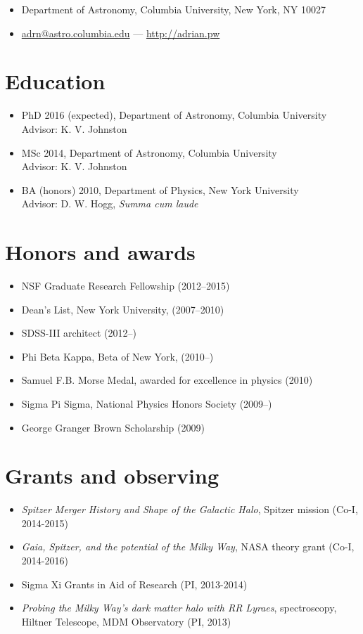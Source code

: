 \documentclass[12pt,letterpaper]{article}
\begin{document}
\thispagestyle{empty}\sloppy\sloppypar

{\huge \name}

\begin{itemize}
  \item Department of Astronomy, Columbia University, New York, NY 10027
  \item \href{mailto:adrn@astro.columbia.edu}{adrn@astro.columbia.edu} --- 
		\href{http://adrian.pw}{http://adrian.pw}
\end{itemize}

\section*{Education}
	\begin{itemize}
	\item PhD 2016 (expected), Department of Astronomy, Columbia University\\
		{Advisor: K. V. Johnston}
	\item MSc 2014, Department of Astronomy, Columbia University\\
		{Advisor: K. V. Johnston}
	\item BA (honors) 2010, Department of Physics, New York University\\ 
		{Advisor: D. W. Hogg, \emph{Summa cum laude}}
	\end{itemize}

\section*{Honors and awards}
	\begin{itemize}
	\item NSF Graduate Research Fellowship (2012--2015)
	\item Dean's List, New York University, (2007--2010)
	\item SDSS-III architect (2012--)
	\item Phi Beta Kappa, Beta of New York, (2010--)
	\item Samuel F.B. Morse Medal, awarded for excellence in physics (2010)
	\item Sigma Pi Sigma, National Physics Honors Society (2009--)
	\item George Granger Brown Scholarship (2009)
	\end{itemize}

\section*{Grants and observing }
	\begin{itemize}
	\item {\it Spitzer Merger History and Shape of the Galactic Halo}, Spitzer mission (Co-I, 2014-2015)
	\item {\it Gaia, Spitzer, and the potential of the Milky Way}, NASA theory grant (Co-I, 2014-2016)
	\item Sigma Xi Grants in Aid of Research (PI, 2013-2014)
	\item {\it Probing the Milky Way's dark matter halo with RR Lyraes}, spectroscopy, Hiltner Telescope, MDM Observatory (PI, 2013)
	\end{itemize}
\end{document}
